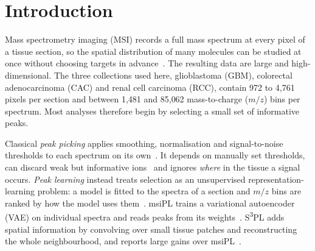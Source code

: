 \section{Introduction}
\label{sec:introduction}

Mass spectrometry imaging (MSI) records a full mass spectrum at every pixel of
a tissue section, so the spatial distribution of many molecules can be studied
at once without choosing targets in
advance~\citep{caprioli1997maldi,schwamborn2010molecular,buchberger2018mass}.
The resulting data are large and high-dimensional. The three collections used
here, glioblastoma (GBM), colorectal adenocarcinoma (CAC) and renal cell
carcinoma (RCC), contain 972 to 4{,}761 pixels per section and between 1{,}481
and 85{,}062 mass-to-charge ($m/z$) bins per spectrum. Most
analyses therefore begin by selecting a small set of informative peaks.

Classical \emph{peak picking} applies smoothing, normalisation and
signal-to-noise thresholds to each spectrum on its
own~\citep{gibb2012maldiquant,deininger2011normalization}. It depends on
manually set thresholds, can discard weak but informative
ions~\citep{lieb2020sparse} and ignores \emph{where} in the tissue a signal
occurs. \emph{Peak learning} instead treats selection as an unsupervised
representation-learning problem: a model is fitted to the spectra of a section
and $m/z$ bins are ranked by how the model uses
them~\citep{abdelmoula2021peak}. msiPL trains a
variational autoencoder (VAE) on individual spectra and reads peaks from its
weights~\citep{abdelmoula2021peak}. S\textsuperscript{3}PL adds spatial information by convolving
over small tissue patches and reconstructing the whole
neighbourhood, and reports large gains over msiPL~\citep{weigand2026spatial}.

